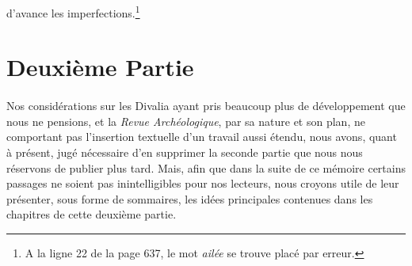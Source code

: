 \documentclass[a4paper, 11pt, oneside, polutonikogreek, french]{article}
\begin{document}
d'avance les imperfections.\footnote{A la ligne 22 de la page 637, le mot \emph{ailée} se trouve placé par erreur.}
\clearpage
\section{Deuxième Partie}
\paragraph{}
Nos considérations sur les Divalia ayant pris beaucoup plus de développement que nous ne pensions, et la \emph{Revue Archéologique}, par sa nature et son plan, ne comportant pas l'insertion textuelle d'un travail aussi étendu, nous avons, quant à présent, jugé nécessaire d'en supprimer la seconde partie que nous nous réservons de publier plus tard. Mais, afin que dans la suite de ce mémoire certains passages ne soient pas inintelligibles pour nos lecteurs, nous croyons utile de leur présenter, sous forme de sommaires, les idées principales contenues dans les chapitres de cette deuxième partie.
\end{document}
